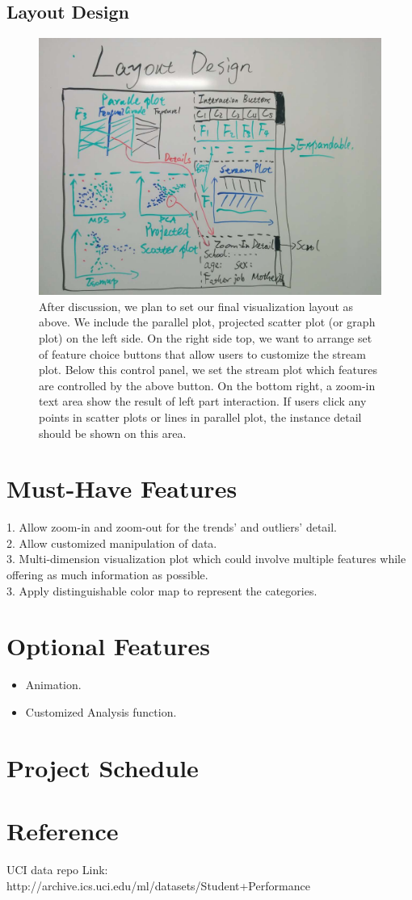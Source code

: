\documentclass{article}
\begin{document}
\subsection{Layout Design}
\begin{figure}[H]
\centering
\includegraphics[scale=0.35]{layout_design.jpg}
\caption{After discussion, we plan to set our final visualization layout as above. We include the parallel plot, projected scatter plot (or graph plot) on the left side. On the right side top, we want to arrange set of feature choice buttons that allow users to customize the stream plot. Below this control panel, we set the stream plot which features are controlled by the above button. On the bottom right, a zoom-in text area show the result  of left part interaction. If users click any points in scatter plots or lines in parallel plot, the instance detail should be shown on this area.}
\end{figure}
\section{Must-Have Features}
1. Allow zoom-in and zoom-out for the trends' and outliers' detail. \\
2. Allow customized manipulation of data. \\ 
3. Multi-dimension visualization plot which could involve multiple features while offering as much information as possible. \\
3. Apply distinguishable color map to represent the categories. \\
\section{Optional Features}
\begin{itemize}
\item Animation.
\item Customized Analysis function.
\end{itemize}
\section{Project Schedule}
\section{Reference}
UCI data repo Link: {http://archive.ics.uci.edu/ml/datasets/Student+Performance}
\end{document}
